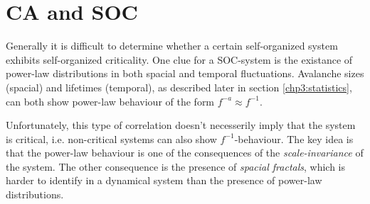 \section{CA and SOC}\label{sec:CAandSOC}
Generally it is difficult to determine whether a certain self-organized system exhibits self-organized criticality. One clue for a SOC-system is the existance of power-law distributions in both spacial and temporal fluctuations. Avalanche sizes (spacial) and lifetimes (temporal), as described later in section \ref{chp3:statistics}, can both show power-law behaviour of the form $f^{-a} \approx f^{-1}$.

Unfortunately, this type of correlation doesn't necesserily imply that the system is critical, i.e. non-critical systems can also show $f^{-1}$-behaviour. The key idea is that the power-law behaviour is one of the consequences of the \emph{scale-invariance} of the system. The other consequence is the presence of \emph{spacial fractals}, which is harder to identify in a dynamical system than the presence of power-law distributions.

